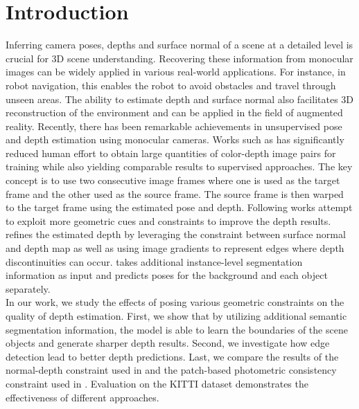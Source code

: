 \documentclass[10pt,twocolumn,letterpaper]{article}
\begin{document}
\section{Introduction}
Inferring camera poses, depths and surface normal of a scene at a detailed level is crucial for 3D scene understanding. Recovering these information from monocular images can be widely applied in various real-world applications. For instance, in robot navigation, this enables the robot to avoid obstacles and travel through unseen areas. The ability to estimate depth and surface normal also facilitates 3D reconstruction of the environment and can be applied in the field of augmented reality.
Recently, there has been remarkable achievements in unsupervised pose and depth estimation using monocular cameras. Works such as \cite{zhou2017unsupervised} has significantly reduced human effort to obtain large quantities of color-depth image pairs for training while also yielding comparable results to supervised approaches. The key concept is to use two consecutive image frames where one is used as the target frame and the other used as the source frame. The source frame is then warped to the target frame using the estimated pose and depth. Following works attempt to exploit more geometric cues and constraints to improve the depth results.\cite{yang2018lego} refines the estimated depth by leveraging the constraint between surface normal and depth map as well as using image gradients to represent edges where depth discontinuities can occur.  \cite{casser2018depth} takes additional instance-level segmentation information as input and predicts poses for the background and each object separately. \\
In our work, we study the effects of posing various geometric constraints on the quality of depth estimation. First, we show that by utilizing additional semantic segmentation information, the model is able to learn the boundaries of the scene objects and generate sharper depth results. Second, we investigate how edge detection lead to better depth predictions. Last, we compare the results of the normal-depth constraint used in \cite{yang2018lego} and the patch-based photometric consistency constraint used in  \cite{furukawa2010accurate}. Evaluation on the KITTI dataset demonstrates the effectiveness of different approaches.


\end{document}
